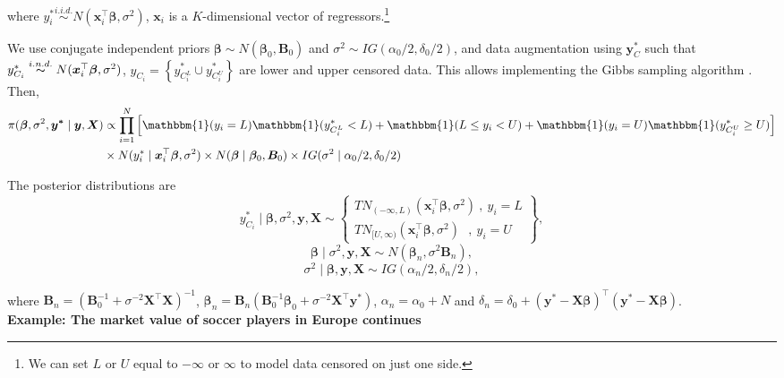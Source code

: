 where $y_i^* \stackrel{i.i.d.}{\sim} N(\bm{x}_i^{\top} \bm{\beta}, \sigma^2)$, $\bm x_i$ is a $K$-dimensional vector of regressors.\footnote{We can set $L$ or $U$ equal to $-\infty$ or $\infty$ to model data censored on just one side.}

We use conjugate independent priors $\bm{\beta}\sim N(\bm{\beta}_0,\bm{B}_0)$ and 
$\sigma^2 \sim IG(\alpha_0/2, \delta_0/2)$, and data augmentation using $\bm{y}^*_C$ such that $y_{C_i}^*\stackrel{i.n.d.} {\thicksim}N(\bm{x}_i^{\top}\bm{\beta},\sigma^2)$, $y_{C_i}=\left\{y_{C_i^L}^*\cup y_{C_i^U}^*\right\}$ are lower and upper censored data. This allows implementing the Gibbs sampling algorithm \cite{Chib1992}.
Then, \begin{align*}
\pi(\bm{\beta},\sigma^2,\bm{y^*}\mid \bm{y},\bm{X})&\propto\prod_{i=1}^N\left[\mathbbm{1}({y_i=L})\mathbbm{1}({y_{C_i^L}^* < L})+\mathbbm{1}({L\leq y_i < U})+\mathbbm{1}({y_i=U})\mathbbm{1}({y_{C_i^U}^* \geq U})\right]\\
&\times{N}(y_i^*\mid \bm{x}_i^{\top}\bm{\beta},\sigma^2)\times N(\bm{\beta}\mid \bm{\beta}_0,\bm{B}_0)\times IG(\sigma^2\mid \alpha_0/2, \delta_0/2)
\end{align*}

The posterior distributions are
\begin{equation*}
	y_{C_i}^*\mid \bm{\beta},\sigma^2,\bm{y},\bm{X}\sim\begin{Bmatrix}
		TN_{(-\infty,L)}(\bm{x}_i^{\top}\bm{\beta},\sigma^2) \ , \ y_i= L \\ 
		TN_{[U,\infty)}(\bm{x}_i^{\top}\bm{\beta},\sigma^2) \ \ \ , \ y_i= U
	\end{Bmatrix},
\end{equation*}
\begin{equation*}
	\bm{\beta}\mid \sigma^2, \bm{y}, \bm{X} \sim {N}(\bm{\beta}_n, \sigma^2\bm{B}_n), 
\end{equation*}
\begin{equation*}
	\sigma^2\mid \bm{\beta}, \bm{y}, \bm{X} \sim IG(\alpha_n/2, \delta_n/2),
\end{equation*}

where $\bm{B}_n = (\bm{B}_0^{-1} + \sigma^{-2}\bm{X}^{\top}\bm{X})^{-1}$, $\bm{\beta}_n= \bm{B}_n(\bm{B}_0^{-1}\bm{\beta}_0 + \sigma^{-2}\bm{X}^{\top}\bm{y}^*)$, $\alpha_n = \alpha_0 + N$ and $\delta_n = \delta_0 + (\bm{y}^*-\bm{X}\bm{\beta})^{\top}(\bm{y}^*-\bm{X}\bm{\beta})$.\\

\textbf{Example: The market value of soccer players in Europe continues}

